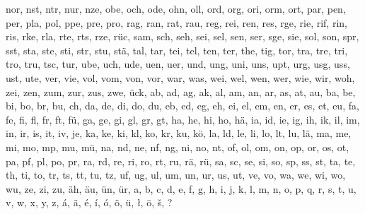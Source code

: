 \documentclass{article} \usepackage{iclr2022_conference,times}
\begin{document}
nor, nst, ntr, nur, nze, obe, och, ode, ohn, oll, ord, org, ori, orm, ort, par, pen, per, pla, pol, ppe, pre, pro, rag, ran, rat, rau, reg, rei, ren, res, rge, rie, rif, rin, ris, rke, rla, rte, rts, rze, rüc, sam, sch, seh, sei, sel, sen, ser, sge, sie, sol, son, spr, sst, sta, ste, sti, str, stu, stä, tal, tar, tei, tel, ten, ter, the, tig, tor, tra, tre, tri, tro, tru, tsc, tur, ube, uch, ude, uen, uer, und, ung, uni, uns, upt, urg, usg, uss, ust, ute, ver, vie, vol, vom, von, vor, war, was, wei, wel, wen, wer, wie, wir, woh, zei, zen, zum, zur, zus, zwe, ück, ab, ad, ag, ak, al, am, an, ar, as, at, au, ba, be, bi, bo, br, bu, ch, da, de, di, do, du, eb, ed, eg, eh, ei, el, em, en, er, es, et, eu, fa, fe, fi, fl, fr, ft, fü, ga, ge, gi, gl, gr, gt, ha, he, hi, ho, hä, ia, id, ie, ig, ih, ik, il, im, in, ir, is, it, iv, je, ka, ke, ki, kl, ko, kr, ku, kö, la, ld, le, li, lo, lt, lu, lä, ma, me, mi, mo, mp, mu, mü, na, nd, ne, nf, ng, ni, no, nt, of, ol, om, on, op, or, os, ot, pa, pf, pl, po, pr, ra, rd, re, ri, ro, rt, ru, rä, rü, sa, sc, se, si, so, sp, ss, st, ta, te, th, ti, to, tr, ts, tt, tu, tz, uf, ug, ul, um, un, ur, us, ut, ve, vo, wa, we, wi, wo, wu, ze, zi, zu, äh, äu, ün, ür, a, b, c, d, e, f, g, h, i, j, k, l, m, n, o, p, q, r, s, t, u, v, w, x, y, z, á, ä, é, í, ó, ö, ü, ł, ō, š, ?
\end{document}
